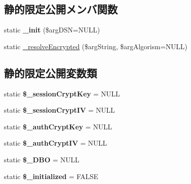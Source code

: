 \subsection*{静的限定公開メンバ関数}
\begin{DoxyCompactItemize}
\item 
\hypertarget{class_auth_ac59ef46d51ed400b343c9ececd308e24}{}static {\bfseries \+\_\+init} (\$arg\+D\+S\+N=N\+U\+L\+L)\label{class_auth_ac59ef46d51ed400b343c9ececd308e24}

\item 
static \hyperlink{class_auth_a8530363c699c10036e8317881419a9d0}{\+\_\+resolve\+Encrypted} (\$arg\+String, \$arg\+Algorism=N\+U\+L\+L)
\end{DoxyCompactItemize}
\subsection*{静的限定公開変数類}
\begin{DoxyCompactItemize}
\item 
\hypertarget{class_auth_a565d83dd2380d91ffa5f12d62dc5a4de}{}static {\bfseries \$\+\_\+session\+Crypt\+Key} = N\+U\+L\+L\label{class_auth_a565d83dd2380d91ffa5f12d62dc5a4de}

\item 
\hypertarget{class_auth_a65a0bf879f0557085e49a43ae490f1a2}{}static {\bfseries \$\+\_\+session\+Crypt\+I\+V} = N\+U\+L\+L\label{class_auth_a65a0bf879f0557085e49a43ae490f1a2}

\item 
\hypertarget{class_auth_af7ecc71fc76b007ffcf44f4f6e75c51a}{}static {\bfseries \$\+\_\+auth\+Crypt\+Key} = N\+U\+L\+L\label{class_auth_af7ecc71fc76b007ffcf44f4f6e75c51a}

\item 
\hypertarget{class_auth_a6fd50a3bc1beb343064ae57c416f4baf}{}static {\bfseries \$\+\_\+auth\+Crypt\+I\+V} = N\+U\+L\+L\label{class_auth_a6fd50a3bc1beb343064ae57c416f4baf}

\item 
\hypertarget{class_auth_a02b83cf2ecb5cfc5b9195d364467a784}{}static {\bfseries \$\+\_\+\+D\+B\+O} = N\+U\+L\+L\label{class_auth_a02b83cf2ecb5cfc5b9195d364467a784}

\item 
\hypertarget{class_auth_a4c9c442e597e0f35f4b7bd60f981ce54}{}static {\bfseries \$\+\_\+initialized} = F\+A\+L\+S\+E\label{class_auth_a4c9c442e597e0f35f4b7bd60f981ce54}

\end{DoxyCompactItemize}


